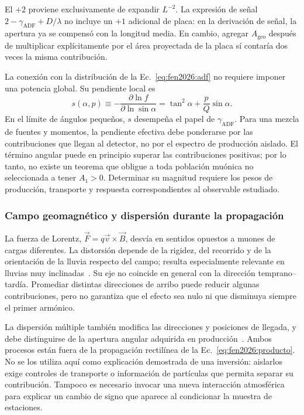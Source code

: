 El $+2$ proviene exclusivamente de expandir $L^{-2}$. La expresión de señal $2-\gamma_{\mathrm{ADF}}+D/\lambda$ no incluye un $+1$ adicional de placa: en la derivación de señal, la apertura ya se compensó con la longitud media. En cambio, agregar $A_{\mathrm{geo}}$ después de multiplicar explícitamente por el área proyectada de la placa sí contaría dos veces la misma contribución.

La conexión con la distribución de la Ec.~\ref{eq:fen2026:adf} no requiere imponer una potencia global. Su pendiente local es
\begin{equation}
s(\alpha,p)\equiv-
\frac{\partial\ln f}{\partial\ln\sin\alpha}
=\tan^2\alpha+\frac{p}{Q}\sin\alpha.
\label{eq:fen2026:pendiente}
\end{equation}
En el límite de ángulos pequeños, $s$ desempeña el papel de $\gamma_{\mathrm{ADF}}$. Para una mezcla de fuentes y momentos, la pendiente efectiva debe ponderarse por las contribuciones que llegan al detector, no por el espectro de producción aislado. El término angular puede en principio superar las contribuciones positivas; por lo tanto, no existe un teorema que obligue a toda población muónica no seleccionada a tener $A_1>0$. Determinar su magnitud requiere los pesos de producción, transporte y respuesta correspondientes al observable estudiado.

\subsubsection{Campo geomagnético y dispersión durante la propagación}
\label{subsubsec:geomagnetico}

La fuerza de Lorentz, $\vec F=q\vec v\times\vec B$, desvía en sentidos opuestos a muones de cargas diferentes. La distorsión depende de la rigidez, del recorrido y de la orientación de la lluvia respecto del campo; resulta especialmente relevante en lluvias muy inclinadas~\cite{GAP2007_124,collaboration_2014}. Su eje no coincide en general con la dirección temprano--tardía. Promediar distintas direcciones de arribo puede reducir algunas contribuciones, pero no garantiza que el efecto sea nulo ni que disminuya siempre el primer armónico.

La dispersión múltiple también modifica las direcciones y posiciones de llegada, y debe distinguirse de la apertura angular adquirida en producción~\cite{Cazon2012}. Ambos procesos están fuera de la propagación rectilínea de la Ec.~\ref{eq:fen2026:producto}. No se los utiliza aquí como explicación demostrada de una inversión: aislarlos exige controles de transporte o información de partículas que permita separar su contribución. Tampoco es necesario invocar una nueva interacción atmosférica para explicar un cambio de signo que aparece al condicionar la muestra de estaciones.

